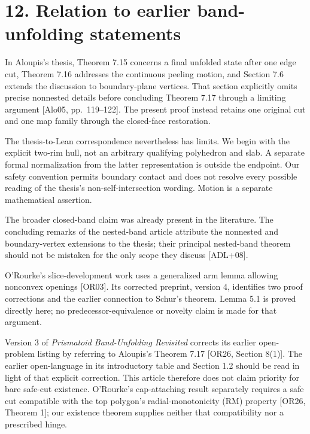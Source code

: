 \documentclass[
  11pt,
  letterpaper,
]{article}
\begin{document}
\section{12. Relation to earlier band-unfolding
statements}\label{relation-to-earlier-band-unfolding-statements}

In Aloupis's thesis, Theorem 7.15 concerns a final unfolded state after
one edge cut, Theorem 7.16 addresses the continuous peeling motion, and
Section 7.6 extends the discussion to boundary-plane vertices. That
section explicitly omits precise nonnested details before concluding
Theorem 7.17 through a limiting argument {[}Alo05, pp.~119--122{]}. The
present proof instead retains one original cut and one map family
through the closed-face restoration.

The thesis-to-Lean correspondence nevertheless has limits. We begin with
the explicit two-rim hull, not an arbitrary qualifying polyhedron and
slab. A separate formal normalization from the latter representation is
outside the endpoint. Our safety convention permits boundary contact and
does not resolve every possible reading of the thesis's
non-self-intersection wording. Motion is a separate mathematical
assertion.

The broader closed-band claim was already present in the literature. The
concluding remarks of the nested-band article attribute the nonnested
and boundary-vertex extensions to the thesis; their principal
nested-band theorem should not be mistaken for the only scope they
discuss {[}ADL+08{]}.

O'Rourke's slice-development work uses a generalized arm lemma allowing
nonconvex openings {[}OR03{]}. Its corrected preprint, version 4,
identifies two proof corrections and the earlier connection to Schur's
theorem. Lemma 5.1 is proved directly here; no predecessor-equivalence
or novelty claim is made for that argument.

Version 3 of \emph{Prismatoid Band-Unfolding Revisited} corrects its
earlier open-problem listing by referring to Aloupis's Theorem 7.17
{[}OR26, Section 8(1){]}. The earlier open-language in its introductory
table and Section 1.2 should be read in light of that explicit
correction. This article therefore does not claim priority for bare
safe-cut existence. O'Rourke's cap-attaching result separately requires
a safe cut compatible with the top polygon's radial-monotonicity (RM)
property {[}OR26, Theorem 1{]}; our existence theorem supplies neither
that compatibility nor a prescribed hinge.
\end{document}
